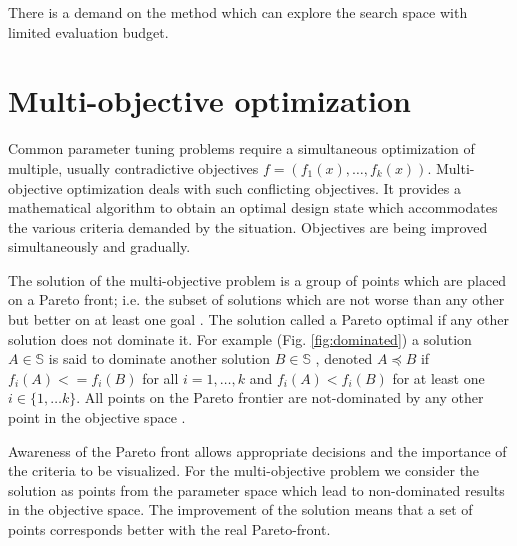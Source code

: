         There is a demand on the method which can explore the search space with limited evaluation budget. 
    

    \section{Multi-objective optimization}
        Common parameter tuning problems require a simultaneous optimization of multiple, usually contradictive objectives $f = (f_1(x), \ldots, f_k(x))$. Multi-objective optimization deals with such conflicting objectives. It provides a mathematical algorithm to obtain an optimal design state which accommodates the various criteria demanded by the situation. Objectives are being improved simultaneously and gradually.

        The solution of the multi-objective problem is a group of points which are placed on a Pareto front; i.e. the subset of solutions which are not worse than any other but better on at least one goal \cite{KrallMD15}. The solution called a Pareto optimal if any other solution does not dominate it. For example (Fig. \ref{fig:dominated}) a solution $A \in \mathbb{S}$ is said to dominate another solution $B \in \mathbb{S}$ , denoted $A \preceq B$ if $f_i(A)<=f_i(B)$ for all $i=1, \ldots ,k$ and $f_i(A)<f_i(B)$ for at least one $i \in \{1, \ldots k\}$. All points on the Pareto frontier are not-dominated by any other point in the objective space \cite{Kaisa0021267}.  

        Awareness of the Pareto front allows appropriate decisions and the importance of the criteria to be visualized. For the multi-objective problem we consider the solution as points from the parameter space which lead to non-dominated results in the objective space. The improvement of the solution means that a set of points corresponds better with the real Pareto-front.

